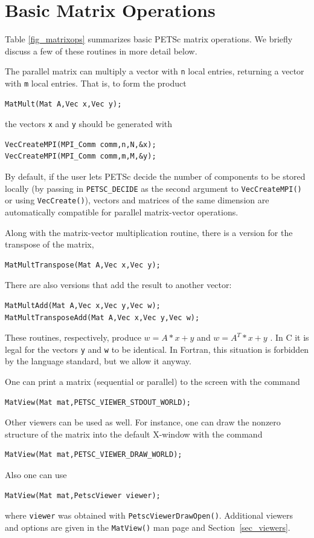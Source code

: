 \section{Basic Matrix Operations}
\label{sec_matoptions}

Table \ref{fig_matrixops} summarizes basic PETSc matrix operations.
We briefly discuss a few of these routines in more detail below.

The parallel matrix can multiply a vector with \lstinline{n}
local entries, returning a vector with \lstinline{m} local entries. That is,
to form the product
\begin{lstlisting}
MatMult(Mat A,Vec x,Vec y);
\end{lstlisting}
the vectors \lstinline{x} and \lstinline{y} should be generated with
\begin{lstlisting}
VecCreateMPI(MPI_Comm comm,n,N,&x);
VecCreateMPI(MPI_Comm comm,m,M,&y);
\end{lstlisting}
By default, if the user lets PETSc decide the number of components to
be stored locally (by passing in \lstinline{PETSC_DECIDE} as the second
argument to \lstinline{VecCreateMPI()} or using \lstinline{VecCreate()}), vectors
and matrices of the same dimension are automatically compatible for
parallel matrix-vector operations.

Along with the matrix-vector multiplication routine, there is
a version for the transpose of the matrix,
\begin{lstlisting}
MatMultTranspose(Mat A,Vec x,Vec y);
\end{lstlisting}
There are also versions that add the result
to another vector:
\begin{lstlisting}
MatMultAdd(Mat A,Vec x,Vec y,Vec w);
MatMultTransposeAdd(Mat A,Vec x,Vec y,Vec w);
\end{lstlisting}
These routines, respectively, produce $ w = A*x + y $ and $ w = A^{T}*x + y$ .
In C it is legal for the vectors \lstinline{y} and \lstinline{w} to be identical.
In Fortran, this situation is forbidden by the language standard,
but we allow it anyway.

One can print a matrix (sequential or parallel) to the screen with the
command
\begin{lstlisting}
MatView(Mat mat,PETSC_VIEWER_STDOUT_WORLD);
\end{lstlisting}
Other viewers can be used as well. For instance, one can draw the
nonzero structure of the matrix into the default X-window with the
command
\begin{lstlisting}
MatView(Mat mat,PETSC_VIEWER_DRAW_WORLD);
\end{lstlisting}
Also one can use
\begin{lstlisting}
MatView(Mat mat,PetscViewer viewer);
\end{lstlisting}
where \lstinline{viewer} was obtained with \lstinline{PetscViewerDrawOpen()}.
Additional viewers and options are given in the \lstinline{MatView()} man
page and Section~\ref{sec_viewers}.

